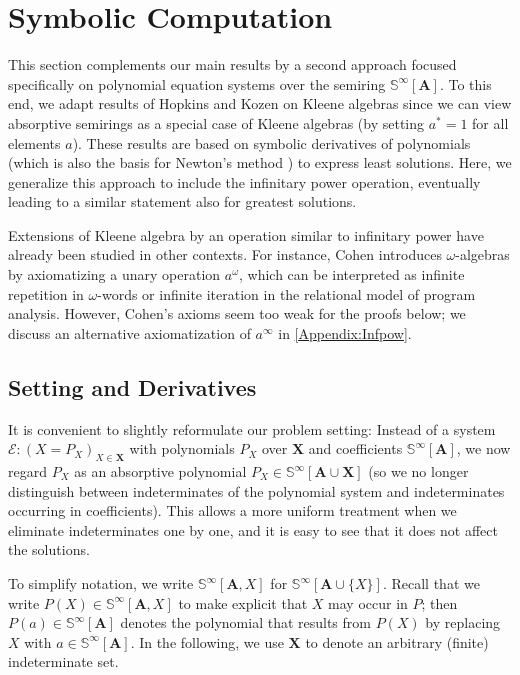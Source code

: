 \documentclass[english,runningheads,a4paper,envcountsame]{llncs}
\newcommand{\Sinf}{{\mathbb S}^{\infty}}
\newcommand*{\XX}{{\bm X}}
\newcommand*{\EE}{\mathcal{E}}
\renewcommand{\AA}{{\bm A}}
\newcommand*{\co}{\colon}
\begin{document}
\section{Symbolic Computation}
\label{sec:Symbolic}

This section complements our main results by a second approach focused specifically on polynomial equation systems over the semiring $\Sinf[\AA]$.
To this end, we adapt results of Hopkins and Kozen on Kleene algebras \cite{Kleene} since we can view absorptive semirings as a special case of Kleene algebras (by setting $a^* = 1$ for all elements $a$).
These results are based on symbolic derivatives of polynomials (which is also the basis for Newton's method \cite{Newton}) to express least solutions.
Here, we generalize this approach to include the infinitary power operation, eventually leading to a similar statement also for greatest solutions.

\begin{remark}
Extensions of Kleene algebra by an operation similar to infinitary power have already been studied in other contexts.
For instance, Cohen \cite{Cohen00} introduces $\omega$-algebras by axiomatizing a unary operation $a^\omega$, which can be interpreted as infinite repetition in $\omega$-words or infinite iteration in the relational model of program analysis.
However, Cohen's axioms seem too weak for the proofs below; we discuss an alternative axiomatization of $a^\infty$ in \cref{Appendix:Infpow}.
\end{remark}


\subsection{Setting and Derivatives}

It is convenient to slightly reformulate our problem setting:
Instead of a system $\EE \co (X = P_X)_{X \in \XX}$ with polynomials $P_X$ over $\XX$ and coefficients $\Sinf[\AA]$, we now regard $P_X$ as an absorptive polynomial $P_X \in \Sinf[\AA \cup \XX]$ (so we no longer distinguish between indeterminates of the polynomial system and indeterminates occurring in coefficients).
This allows a more uniform treatment when we eliminate indeterminates one by one, and it is easy to see that it does not affect the solutions.

To simplify notation, we write $\Sinf[\AA,X]$ for $\Sinf[\AA \cup \{X\}]$.
Recall that we write $P(X) \in \Sinf[\AA, X]$ to make explicit that $X$ may occur in $P$;
then $P(a) \in \Sinf[\AA]$ denotes the polynomial that results from $P(X)$ by replacing $X$ with $a \in \Sinf[\AA]$.
In the following, we use $\XX$ to denote an arbitrary (finite) indeterminate set.
\end{document}
